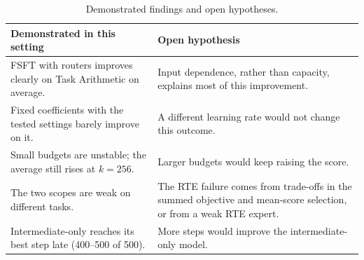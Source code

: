 \begin{table}[htbp]
  \centering\tablestyle
  \caption{Demonstrated findings and open hypotheses.}
  \label{tab:findings}
  \begin{tabularx}{\linewidth}{*{2}{>{\raggedright\arraybackslash}X}}
    \toprule
    Demonstrated in this setting & Open hypothesis\\
    \midrule
    FSFT with routers improves clearly on Task Arithmetic on average. & Input dependence, rather than capacity, explains most of this improvement.\\
    Fixed coefficients with the tested settings barely improve on it. & A different learning rate would not change this outcome.\\
    Small budgets are unstable; the average still rises at $k=256$. & Larger budgets would keep raising the score.\\
    The two scopes are weak on different tasks. & The RTE failure comes from trade-offs in the summed objective and mean-score selection, or from a weak RTE expert.\\
    Intermediate-only reaches its best step late (400--500 of 500). & More steps would improve the intermediate-only model.\\
    \bottomrule
  \end{tabularx}
\end{table}
